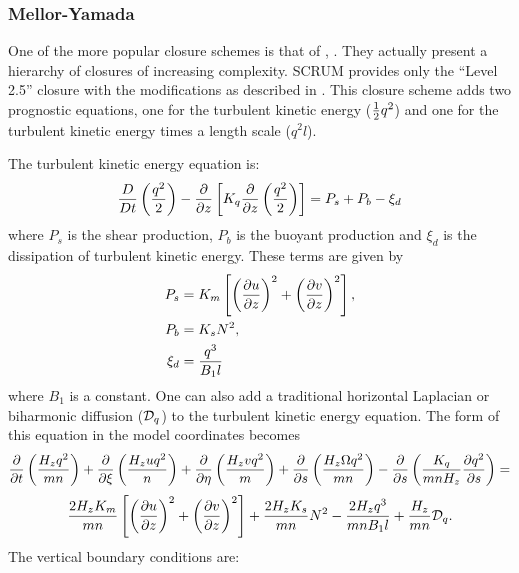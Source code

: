 \subsubsection{Mellor-Yamada}
One of the more popular closure schemes is that of 
\cite{Mellor74}, \cite{Mellor82}. They actually present a hierarchy of
closures of increasing complexity. SCRUM provides only the
``Level 2.5'' closure with the \cite{Galperin88}
modifications as described in \cite{Allen95}.
This closure scheme adds two prognostic equations, one
for the turbulent kinetic energy (${1 \over 2} q^2$) and one for the
turbulent kinetic energy times a length scale ($q^2l$).

The turbulent kinetic energy equation is:
\begin{equation}
  {D \over Dt} \left( {q^2 \over 2} \right) -
  {\partial \over \partial z} \left[ K_q {\partial \over \partial z} 
  \left( {q^2 \over 2} \right) \right] = P_s + P_b - \xi_d
\end{equation}
where $P_s$ is the shear production, $P_b$ is the buoyant production
and $\xi_d$ is the dissipation of turbulent kinetic energy. 
These terms are given by
\begin{align}
   P_s &= K_m \left[ \left( {\partial u \over \partial z }\right)^2 +
   \left( {\partial v \over \partial z} \right)^2 \right],  \\
   P_b &= K_s N^2, \\
   \xi_d &= {q^3 \over B_1 l}
\end{align}
where $B_1$ is a constant.
One can also add a traditional horizontal Laplacian or biharmonic
diffusion (${\cal D}_q$) to the turbulent kinetic energy equation.
The form of this equation in the model coordinates becomes
{\samepage
\[
  {\partial \over \partial t} \left( {H_z q^2 \over mn} \right) +
  {\partial \over \partial \xi} \left( {H_z u q^2 \over n} \right) +
  {\partial \over \partial \eta} \left( {H_z v q^2 \over m} \right) +
  {\partial \over \partial s} \left( {H_z \Omega q^2 \over mn} \right) -
  {\partial \over \partial s} \left( {K_q \over mnH_z}
  {\partial q^2 \over \partial s} \right) =
\]
\begin{equation}
  {2H_z K_m \over mn} \left[ \left({\partial u \over \partial z}
  \right)^2 + \left( {\partial v \over \partial z} \right)^2 \right] +
  {2H_z K_s \over mn} N^2 - {2H_z q^3 \over mnB_1 l} +
  {H_z \over mn} {\cal D}_q .
\end{equation}
}
The vertical boundary conditions are:
